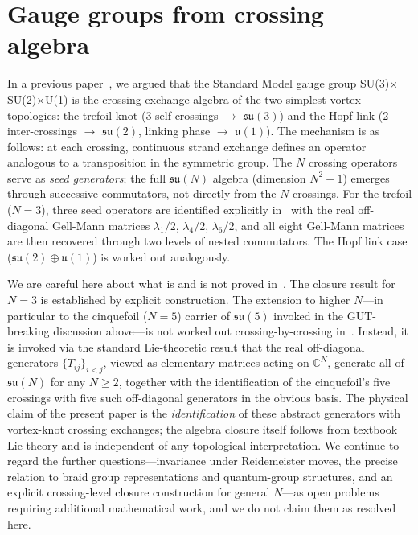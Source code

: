 \documentclass[11pt]{article}
\begin{document}
\section{Gauge groups from crossing algebra}
\label{sec:gauge}

In a previous paper~\cite{NWT8}, we argued that the Standard Model gauge group SU(3)$\times$SU(2)$\times$U(1) is the crossing exchange algebra of the two simplest vortex topologies: the trefoil knot (3 self-crossings $\to$ $\mathfrak{su}(3)$) and the Hopf link (2 inter-crossings $\to$ $\mathfrak{su}(2)$, linking phase $\to$ $\mathfrak{u}(1)$).
The mechanism is as follows: at each crossing, continuous strand exchange defines an operator analogous to a transposition in the symmetric group.
The $N$ crossing operators serve as \emph{seed generators}; the full $\mathfrak{su}(N)$ algebra (dimension $N^2 - 1$) emerges through successive commutators, not directly from the $N$ crossings.
For the trefoil ($N = 3$), three seed operators are identified explicitly in~\cite{NWT8} with the real off-diagonal Gell-Mann matrices $\lambda_1/2$, $\lambda_4/2$, $\lambda_6/2$, and all eight Gell-Mann matrices are then recovered through two levels of nested commutators.
The Hopf link case ($\mathfrak{su}(2) \oplus \mathfrak{u}(1)$) is worked out analogously.

We are careful here about what is and is not proved in~\cite{NWT8}.
The closure result for $N = 3$ is established by explicit construction.
The extension to higher $N$---in particular to the cinquefoil ($N = 5$) carrier of $\mathfrak{su}(5)$ invoked in the GUT-breaking discussion above---is not worked out crossing-by-crossing in~\cite{NWT8}.
Instead, it is invoked via the standard Lie-theoretic result that the real off-diagonal generators $\{T_{ij}\}_{i<j}$, viewed as elementary matrices acting on $\mathbb{C}^N$, generate all of $\mathfrak{su}(N)$ for any $N \geq 2$, together with the identification of the cinquefoil's five crossings with five such off-diagonal generators in the obvious basis.
The physical claim of the present paper is the \emph{identification} of these abstract generators with vortex-knot crossing exchanges; the algebra closure itself follows from textbook Lie theory and is independent of any topological interpretation.
We continue to regard the further questions---invariance under Reidemeister moves, the precise relation to braid group representations and quantum-group structures, and an explicit crossing-level closure construction for general $N$---as open problems requiring additional mathematical work, and we do not claim them as resolved here.
\end{document}
